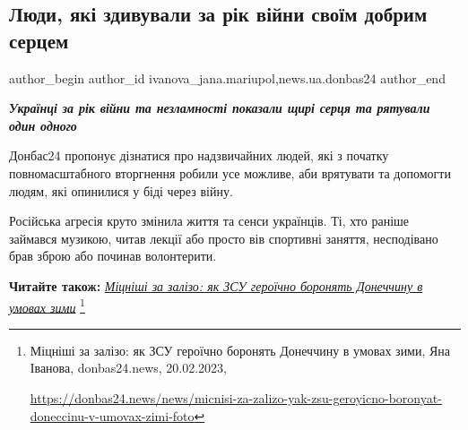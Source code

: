  
 
 
 
 
 
\subsection{Люди, які здивували за рік війни своїм добрим серцем}
\label{sec:21_02_2023.stz.news.ua.donbas24.3.ljudy_zdyvuvaly_za_rik_vijny_dobrym_sercem}
 
\ifcmt
 author_begin
   author_id ivanova_jana.mariupol,news.ua.donbas24
 author_end
\fi

\begin{center}
  \em\color{blue}\bfseries\Large
Українці за рік війни та незламності показали щирі серця та рятували один одного
\end{center}

Донбас24 пропонує дізнатися про надзвичайних людей, які з початку
повномасштабного вторгнення робили усе можливе, аби врятувати та допомогти
людям, які опинилися у біді через війну.

Російська агресія круто змінила життя та сенси українців. Ті, хто раніше
займався музикою, читав лекції або просто вів спортивні заняття, несподівано
брав зброю або починав волонтерити.

\textbf{Читайте також:} \href{https://donbas24.news/news/micnisi-za-zalizo-yak-zsu-geroyicno-boronyat-doneccinu-v-umovax-zimi-foto}{\emph{Міцніші за залізо: як ЗСУ героїчно боронять Донеччину в умовах зими}}%
\footnote{Міцніші за залізо: як ЗСУ героїчно боронять Донеччину в умовах зими, Яна Іванова, donbas24.news, 20.02.2023, \par%
\url{https://donbas24.news/news/micnisi-za-zalizo-yak-zsu-geroyicno-boronyat-doneccinu-v-umovax-zimi-foto}%
}


